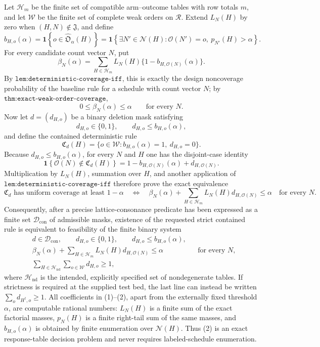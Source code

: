 Let \(\mathscr H_m\) be the finite set of compatible arm--outcome tables with row totals \(m\), and let \(\mathscr W\) be the finite set of complete weak orders on \(\mathcal R\). Extend \(L_N(H)\) by zero when \((H,N)\notin\mathfrak J\), and define
\[
 b_{H,o}(\alpha)
 =\mathbf 1\!\left\{o\in\widehat{\mathfrak O}_{\alpha}(H)\right\}
 =\mathbf 1\!\left\{\exists N'\in\mathcal N(H):
       \mathcal O(N')=o,\ p_{N'}(H)>\alpha\right\}.
\]
For every candidate count vector \(N\), put
\[
 \beta_N(\alpha)
 =\sum_{H\in\mathscr H_m}L_N(H)
       \{1-b_{H,\mathcal O(N)}(\alpha)\}.
\]
By \(\texttt{lem:deterministic-coverage-iff}\), this is exactly the design noncoverage probability of the baseline rule for a schedule with count vector \(N\); by \(\texttt{thm:exact-weak-order-coverage}\),
\[
 0\le \beta_N(\alpha)\le\alpha
 \qquad\text{for every }N.
\]
Now let \(d=(d_{H,o})\) be a binary deletion mask satisfying
\[
 d_{H,o}\in\{0,1\},
 \qquad d_{H,o}\le b_{H,o}(\alpha),
\]
and define the contained deterministic rule
\[
 \mathfrak C_d(H)
 =\{o\in\mathscr W:b_{H,o}(\alpha)=1,\ d_{H,o}=0\}.
\]
Because \(d_{H,o}\le b_{H,o}(\alpha)\), for every \(N\) and \(H\) one has the disjoint-case identity
\[
 \mathbf 1\!\left\{\mathcal O(N)\notin\mathfrak C_d(H)\right\}
 =1-b_{H,\mathcal O(N)}(\alpha)+d_{H,\mathcal O(N)}.
\]
Multiplication by \(L_N(H)\), summation over \(H\), and another application of \(\texttt{lem:deterministic-coverage-iff}\) therefore prove the exact equivalence
\[
 \mathfrak C_d\text{ has uniform coverage at least }1-\alpha
 \quad\Longleftrightarrow\quad
 \beta_N(\alpha)+
 \sum_{H\in\mathscr H_m}L_N(H)d_{H,\mathcal O(N)}
 \le\alpha
 \quad\text{for every }N. \tag{1}
\]
Consequently, after a precise lattice-consonance predicate has been expressed as a finite set \(\mathscr D_{\mathrm{con}}\) of admissible masks, existence of the requested strict contained rule is equivalent to feasibility of the finite binary system
\[
 \begin{aligned}
 &d\in\mathscr D_{\mathrm{con}},\qquad
   d_{H,o}\in\{0,1\},\qquad d_{H,o}\le b_{H,o}(\alpha),\\
 &\beta_N(\alpha)+\sum_{H\in\mathscr H_m}
     L_N(H)d_{H,\mathcal O(N)}\le\alpha
     &&\text{for every }N,\\
 &\sum_{H\in\mathscr H_{\mathrm{nd}}}\sum_{o\in\mathscr W}d_{H,o}\ge1,
 \end{aligned} \tag{2}
\]
where \(\mathscr H_{\mathrm{nd}}\) is the intended, explicitly specified set of nondegenerate tables. If strictness is required at the supplied test bed, the last line can instead be written \(\sum_o d_{H^\dagger,o}\ge1\). All coefficients in (1)--(2), apart from the externally fixed threshold \(\alpha\), are computable rational numbers: \(L_N(H)\) is a finite sum of the exact factorial masses, \(p_N(H)\) is a finite right-tail sum of the same masses, and \(b_{H,o}(\alpha)\) is obtained by finite enumeration over \(\mathcal N(H)\). Thus (2) is an exact response-table decision problem and never requires labeled-schedule enumeration.

